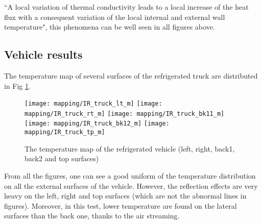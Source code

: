 ``A local variation of thermal conductivity leads to a local increase of the heat flux with a consequent variation of the local internal and external wall temperature"\citep{rossi2009k}, this phenomena can be well seen in all figures above.

\subsection{Vehicle results}
The temperature map of several surfaces of the refrigerated truck are distributed in Fig \ref{IR_truck}.
\begin{figure}[!htbp]
	\centering
	\texttt{[image: mapping/IR\_truck\_lt\_m]}
	\hspace{6pt}
	\texttt{[image: mapping/IR\_truck\_rt\_m]}
	\vspace{3pt}
	\texttt{[image: mapping/IR\_truck\_bk11\_m]}
	\hspace{6pt}
	\texttt{[image: mapping/IR\_truck\_bk12\_m]}
	\texttt{[image: mapping/IR\_truck\_tp\_m]}
	\caption{The temperature map of the refrigerated vehicle (left, right, back1, back2 and top surfaces)}
	\label{IR_truck}
\end{figure}
From all the figures, one can see a good uniform of the temperature distribution on all the external surfaces of the vehicle. However, the reflection effects are very heavy on the left, right and top surfaces (which are not the abnormal lines in figures). Moreover, in this test, lower temperature are found on the lateral surfaces than the back one, thanks to the air streaming.

